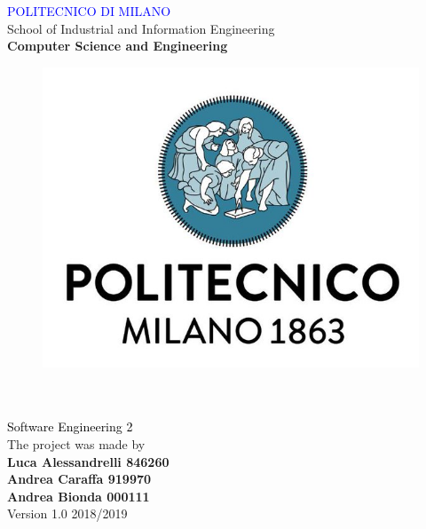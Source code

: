 
\usepackage{placeins}
\usepackage{graphicx,color,listings}
\usepackage{float}
\usepackage[export]{adjustbox}
\usepackage{hyperref}%
\hypersetup{%
  colorlinks = true,
  linkcolor  = black
}




\begin{titlepage}

\centering
{\textcolor{Blue}{\LARGE  {POLITECNICO DI MILANO}}}\\[0.5CM]
\Large {School of Industrial and Information Engineering}\\[0.3CM]
\textbf{\Large Computer Science and Engineering}\\
[1cm]
\begin{figure}[H]
\centering
\includegraphics[scale = 0.3]{Images/Logo/logo.jpg}\\
[1cm]
\end{figure}
{\fontsize{35}{35} }\\[0.5cm]
{\fontsize{25}{70} }\\[0.5cm]     
{\textcolor{Black}{\LARGE{Software Engineering 2}}}\\ [2cm]     
\centering
The project was made by\\[0.5cm]
\textbf {\LARGE Luca Alessandrelli 846260}\\[0.2cm]
\textbf {\LARGE Andrea Caraffa 919970}\\[0.2cm]
\textbf {\LARGE Andrea Bionda 000111 }\\[0.5cm]
Version 1.0 2018/2019
\end{titlepage}

